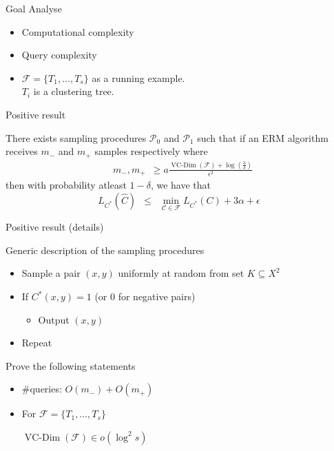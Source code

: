 \documentclass{beamer}
\newcommand{\mc}{\mathcal}
\DeclareMathOperator*{\vcdim}{VC-Dim}
\begin{document}
\begin{frame}{Goal}
Analyse
	\begin{itemize}
		\vspace{15pt}\item Computational complexity
		\vspace{15pt}\item Query complexity
		\vspace{20pt}\item $\mc F = \{T_1, \ldots, T_s\}$ as a running example.\\
		\vspace{10pt}$T_i$ is a clustering tree.
	\end{itemize}
\end{frame}

\begin{frame}[label=RCCPositive]{Positive result}
	\begin{block}{}
		There exists sampling procedures \hyperlink{detailsRCCNegative}{$\mc P_0$} and \hyperlink{detailsRCCPositive}{$\mc P_1$} such that if an ERM algorithm receives $m_-$ and $m_+$ samples respectively where
		\begin{align*}
		  &m_-, m_+ \enspace \ge a\frac{\vcdim({\mc F}) + \log(\frac{3}{\delta})}{\epsilon^2} 
		\end{align*}
		then with probability atleast $1-\delta$, we have that $$L_{C^*}(\hat C) \enspace\le\enspace \min_{\mc C \in \mc F} L_{C^*}(C) + 3\alpha + \epsilon$$
	\end{block}
\end{frame}

\begin{frame}[label=RCCVCDim]{Positive result (details)}
	\begin{block}{Generic description of the sampling procedures}
		\begin{itemize}
			\vspace{5pt}\item Sample a pair $(x, y)$ uniformly at random from set $K \subseteq X^2$ 
			\vspace{5pt}\item If $C^*(x, y) = 1$ (or $0$ for negative pairs)
			\begin{itemize}
				\item[] Output $(x, y)$
			\end{itemize}
			\item Repeat
		\end{itemize}
	\end{block}
	\vspace{20pt}Prove the following statements
	\begin{itemize}
		\vspace{5pt}\item \#queries: $O(m_-) + O(m_+)$
		\vspace{5pt}\item For \hyperlink{detailsRCCVCDim}{$\mc F = \{T_1, \ldots, T_s\}$}\\
			\begin{center}$\vcdim({\mc F}) \in o(\log^2 s) $\end{center}
	\end{itemize}		
\end{frame}
\end{document}
